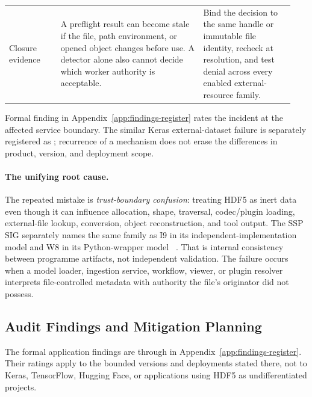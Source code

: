 \documentclass[../main.tex]{subfiles}
\begin{document}
\begin{longtable}{@{}p{0.17\linewidth}p{0.47\linewidth}p{0.30\linewidth}@{}}
Closure evidence &
A preflight result can become stale if the file, path environment, or opened
object changes before use. A detector alone also cannot decide which worker
authority is acceptable. &
Bind the decision to the same handle or immutable file identity, recheck at
resolution, and test denial across every enabled external-resource family. \\

\end{longtable}
\endgroup

Formal finding  in
Appendix~\ref{app:findings-register} rates the
incident at the affected service boundary. The similar Keras external-dataset
failure is separately registered as ; recurrence of a
mechanism does not erase the differences in product, version, and deployment
scope.

\paragraph{The unifying root cause.}
The repeated mistake is \emph{trust-boundary confusion}: treating HDF5 as inert
data even though it can influence allocation, shape, traversal, codec/plugin
loading, external-file lookup, conversion, object reconstruction, and tool
output. The SSP SIG separately names the same family as I9 in its
independent-implementation model and W8 in its Python-wrapper model
~\cite{hdf5-indie-model,hdf5-python-wrapper-model}. That is internal
consistency between programme artifacts, not independent validation. The
failure occurs when a model loader, ingestion service, workflow, viewer, or
plugin resolver interprets file-controlled metadata with authority the file's
originator did not possess.

\subsection{Audit Findings and Mitigation Planning}

The formal application findings are  through
 in Appendix~\ref{app:findings-register}. Their ratings apply
to the bounded versions and deployments stated there, not to Keras,
TensorFlow, Hugging Face, or applications using HDF5 as undifferentiated
projects.
\end{document}
